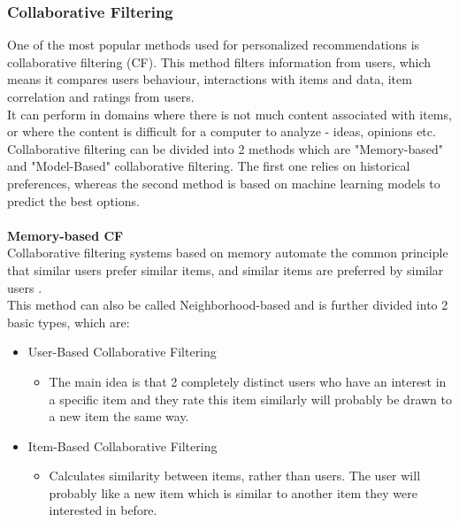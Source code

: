 \documentclass[\myFontSize,a4paper,oneside,hidelinks]{article}
\begin{document}
\subsubsection{Collaborative Filtering}
One of the most popular methods used for personalized recommendations is collaborative filtering (CF). This method filters information from users, which means it compares users behaviour, interactions with items and data, item correlation and ratings from users. \\
It can perform in domains where there is not much content associated with items, or where the content is difficult for a computer to analyze - ideas, opinions etc.\cite{melville:aaai02}\\
Collaborative filtering can be divided into 2 methods which are "Memory-based" and "Model-Based" collaborative filtering. The first one relies on historical preferences, whereas the second method is based on machine learning models to predict the best options.\\\\
%
\textbf{Memory-based CF}\\
Collaborative filtering systems based on memory automate the common principle that similar users prefer similar items, and similar items are preferred by similar users \cite{Ning201537}. \\
This method can also be called Neighborhood-based and is further divided into 2 basic types, which are:
\begin{itemize}
\item User-Based Collaborative Filtering
	\begin{itemize}
	\item The main idea is that 2 completely distinct users who have an interest in a specific item and they rate this item similarly will probably be drawn to a new item the same way.
	\end{itemize}
\item Item-Based Collaborative Filtering
	\begin{itemize}
	\item Calculates similarity between items, rather than users. The user will probably like a new item which is similar to another item they were interested in before.\\
	\end{itemize}
\end{itemize}
%
%
\end{document}
